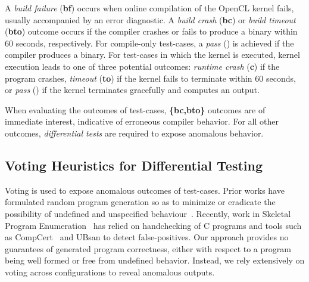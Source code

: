 A \emph{build failure} (\textbf{bf}) occurs when online compilation of the OpenCL kernel fails, usually accompanied by an error diagnostic. A \emph{build crash} (\textbf{bc}) or \emph{build timeout} (\textbf{bto}) outcome occurs if the compiler crashes or fails to produce a binary within 60 seconds, respectively. For compile-only test-cases, a \emph{pass} (\textbf{\cmark}) is achieved if the compiler produces a binary. For test-cases in which the kernel is executed, kernel execution leads to one of three potential outcomes: \emph{runtime crash} (\textbf{c}) if the program crashes, \emph{timeout} (\textbf{to}) if the kernel fails to terminate within 60 seconds, or \emph{pass} (\textbf{\cmark}) if the kernel terminates gracefully and computes an output. 
%

When evaluating the outcomes of test-cases, \textbf{\{bc,bto\}} outcomes are of immediate interest, indicative of erroneous compiler behavior. For all other outcomes, \emph{differential tests} are required to expose anomalous behavior.


\subsection{Voting Heuristics for Differential Testing}

Voting is used to expose anomalous outcomes of test-cases. Prior works have formulated random program generation so as to minimize or eradicate the possibility of undefined and unspecified behaviour~\cite{Yang2011c,Le2013a,Le2015}. Recently, work in Skeletal Program Enumeration~\cite{Zhang2017a} has relied on handchecking of C programs and tools such as CompCert~\cite{Leroy2013} and UBsan to detect false-positives. Our approach provides no guarantees of generated program correctness, either with respect to a program being well formed or free from undefined behavior. Instead, we rely extensively on voting across configurations to reveal anomalous outputs.

